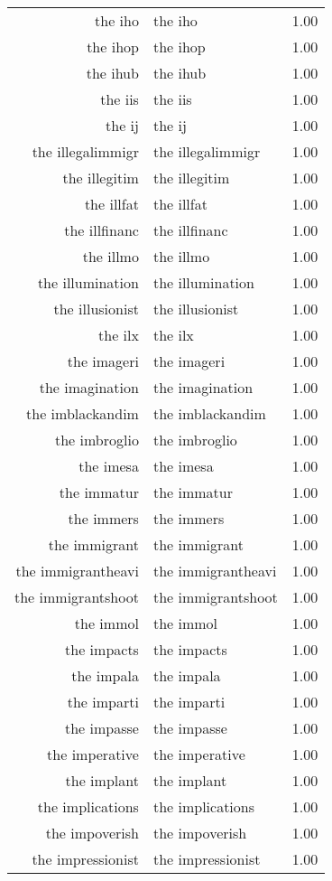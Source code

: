 \begin{table}[ht]
\begin{tabular}{rlr}
  the iho & the iho & 1.00 \\ 
  the ihop & the ihop & 1.00 \\ 
  the ihub & the ihub & 1.00 \\ 
  the iis & the iis & 1.00 \\ 
  the ij & the ij & 1.00 \\ 
  the illegalimmigr & the illegalimmigr & 1.00 \\ 
  the illegitim & the illegitim & 1.00 \\ 
  the illfat & the illfat & 1.00 \\ 
  the illfinanc & the illfinanc & 1.00 \\ 
  the illmo & the illmo & 1.00 \\ 
  the illumination & the illumination & 1.00 \\ 
  the illusionist & the illusionist & 1.00 \\ 
  the ilx & the ilx & 1.00 \\ 
  the imageri & the imageri & 1.00 \\ 
  the imagination & the imagination & 1.00 \\ 
  the imblackandim & the imblackandim & 1.00 \\ 
  the imbroglio & the imbroglio & 1.00 \\ 
  the imesa & the imesa & 1.00 \\ 
  the immatur & the immatur & 1.00 \\ 
  the immers & the immers & 1.00 \\ 
  the immigrant & the immigrant & 1.00 \\ 
  the immigrantheavi & the immigrantheavi & 1.00 \\ 
  the immigrantshoot & the immigrantshoot & 1.00 \\ 
  the immol & the immol & 1.00 \\ 
  the impacts & the impacts & 1.00 \\ 
  the impala & the impala & 1.00 \\ 
  the imparti & the imparti & 1.00 \\ 
  the impasse & the impasse & 1.00 \\ 
  the imperative & the imperative & 1.00 \\ 
  the implant & the implant & 1.00 \\ 
  the implications & the implications & 1.00 \\ 
  the impoverish & the impoverish & 1.00 \\ 
  the impressionist & the impressionist & 1.00 \\ 

\end{tabular}
\end{table}
